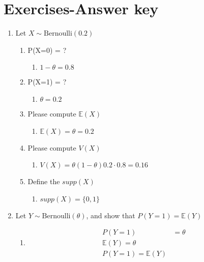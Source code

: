 \documentclass[krantz1,ChapterTOCs]{krantz}
\begin{document}
\section{Exercises-Answer key}

\begin{enumerate}
    \item Let $X \sim \text{Bernoulli}(0.2)$
    \begin{enumerate}
        \item P(X=0) = ?
        \begin{enumerate}
            \item {\color{red} $1-\theta = 0.8$  }
        \end{enumerate}
        \item P(X=1) = ?
        \begin{enumerate}
            \item {\color{red} $\theta = 0.2$  }
        \end{enumerate}

        \item Please compute $\mathbb{E}(X)$
        \begin{enumerate}
            \item {\color{red} $\mathbb{E}(X) = \theta = 0.2$  }
        \end{enumerate}

        \item Please compute $V(X)$
        \begin{enumerate}
            \item {\color{red} $V(X) = \theta (1-\theta) 0.2 \cdot 0.8 = 0.16$  }
        \end{enumerate}

        \item Define the $supp(X)$
        \begin{enumerate}
            \item {\color{red} $supp(X) = \{0,1\}$  }
        \end{enumerate}

    \end{enumerate}
    
    \item Let $Y \sim \text{Bernoulli}(\theta)$, and 
    show that $P(Y=1) = \mathbb{E}(Y)$
    \begin{enumerate}
        \item {\color{red} 
            \begin{align}
                P(Y=1) &= \theta\\
                \mathbb{E}(Y) = \theta\\
                P(Y=1) = \mathbb{E}(Y)
            \end{align}
          }
    \end{enumerate}



\end{enumerate}
\end{document}
